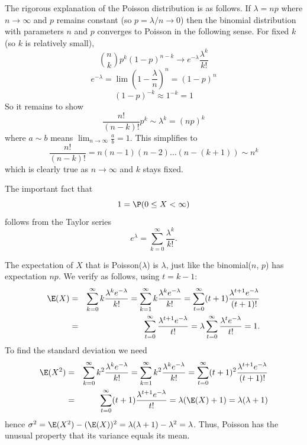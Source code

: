 The rigorous explanation of the Poisson distribution is as follows. If $\lambda=np$ where $n\to\infty$ and $p$ remains constant (so $p=\lambda/n\to 0$) then the binomial distribution with parameters $n$ and $p$ converges to Poisson in the following sense. For fixed $k$ (so $k$ is relatively small),
\[
	\binom{n}{k}p^k(1-p)^{n-k} \to e^{-\lambda}\frac{\lambda^k}{k!}
\]
\[
	e^{-\lambda} = \lim \left(1-\frac\lambda{n}\right)^n = (1-p)^n
\]
\[
	(1-p)^{-k} \approx 1^{-k} = 1
\]
So it remains to show
\[
	\frac{n!}{(n-k)!} p^k \sim \lambda^k = (np)^k
\]
where $a\sim b$ means $\lim_{n\to\infty} \frac{a}b=1$.
This simplifies to
\[
	\frac{n!}{(n-k)!} = n(n-1)(n-2)\dots (n-(k+1)) \sim n^k
\]
which is clearly true as $n\to\infty$ and $k$ stays fixed.

The important fact that
\[
	1 = \P(0\le X<\infty)
\]
follows from the Taylor series
\[
	e^\lambda = \sum_{k=0}^\infty \frac{\lambda^k}{k!}.
\]

The expectation of $X$ that is Poisson($\lambda$) is $\lambda$, just like the binomial($n$, $p$) has expectation $np$.
We verify as follows, using $t=k-1$:
\begin{eqnarray*}
\E(X) &=& \sum_{k=0}^\infty k \frac{\lambda^{k} e^{-\lambda}}{k!} = \sum_{k=1}^\infty k \frac{\lambda^{k} e^{-\lambda}}{k!} =\sum_{t=0}^\infty (t+1) \frac{\lambda^{t+1} e^{-\lambda}}{(t+1)!}
\\
&=&\sum_{t=0}^\infty \frac{\lambda^{t+1} e^{-\lambda}}{t!} =\lambda \sum_{t=0}^\infty \frac{\lambda^{t} e^{-\lambda}}{t!} = 1.
\end{eqnarray*}
To find the standard deviation we need
\begin{eqnarray*}
	\E(X^2) &=& \sum_{k=0}^\infty k^2 \frac{\lambda^{k} e^{-\lambda}}{k!} = \sum_{k=1}^\infty k^2 \frac{\lambda^{k} e^{-\lambda}}{k!} = \sum_{t=0}^\infty (t+1)^2 \frac{\lambda^{t+1} e^{-\lambda}}{(t+1)!}
\\
&=& \sum_{t=0}^\infty (t+1) \frac{\lambda^{t+1} e^{-\lambda}}{t!} = \lambda (\E(X) + 1) = \lambda(\lambda+1)
\end{eqnarray*}
hence $\sigma^2 = \E(X^2)-(\E(X))^2 = \lambda(\lambda+1) - \lambda^2 = \lambda$. Thus, Poisson has the unusual property that its variance equals its mean.


